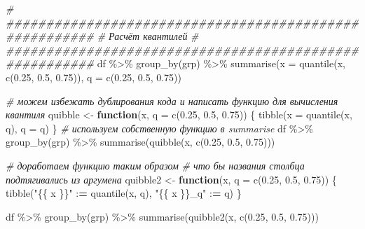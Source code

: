 \documentclass[
]{book}
\newenvironment{Shaded}{\begin{snugshade}}{\end{snugshade}}
\newcommand{\AttributeTok}[1]{\textcolor[rgb]{0.77,0.63,0.00}{#1}}
\newcommand{\CommentTok}[1]{\textcolor[rgb]{0.56,0.35,0.01}{\textit{#1}}}
\newcommand{\ControlFlowTok}[1]{\textcolor[rgb]{0.13,0.29,0.53}{\textbf{#1}}}
\newcommand{\ErrorTok}[1]{\textcolor[rgb]{0.64,0.00,0.00}{\textbf{#1}}}
\newcommand{\FloatTok}[1]{\textcolor[rgb]{0.00,0.00,0.81}{#1}}
\newcommand{\FunctionTok}[1]{\textcolor[rgb]{0.00,0.00,0.00}{#1}}
\newcommand{\NormalTok}[1]{#1}
\newcommand{\OtherTok}[1]{\textcolor[rgb]{0.56,0.35,0.01}{#1}}
\newcommand{\SpecialCharTok}[1]{\textcolor[rgb]{0.00,0.00,0.00}{#1}}
\newcommand{\StringTok}[1]{\textcolor[rgb]{0.31,0.60,0.02}{#1}}
\begin{document}
\begin{Shaded}
\begin{Highlighting}[]
\CommentTok{\# \#\#\#\#\#\#\#\#\#\#\#\#\#\#\#\#\#\#\#\#\#\#\#\#\#\#\#\#\#\#\#\#\#\#\#\#\#\#\#\#\#\#\#\#\#\#\#\#\#\#\#\#\#\#\#}
\CommentTok{\# Расчёт квантилей}
\CommentTok{\# \#\#\#\#\#\#\#\#\#\#\#\#\#\#\#\#\#\#\#\#\#\#\#\#\#\#\#\#\#\#\#\#\#\#\#\#\#\#\#\#\#\#\#\#\#\#\#\#\#\#\#\#\#\#\#}
\NormalTok{df }\SpecialCharTok{\%\textgreater{}\%} 
  \FunctionTok{group\_by}\NormalTok{(grp) }\SpecialCharTok{\%\textgreater{}\%} 
  \FunctionTok{summarise}\NormalTok{(}\AttributeTok{x =} \FunctionTok{quantile}\NormalTok{(x, }\FunctionTok{c}\NormalTok{(}\FloatTok{0.25}\NormalTok{, }\FloatTok{0.5}\NormalTok{, }\FloatTok{0.75}\NormalTok{)), }\AttributeTok{q =} \FunctionTok{c}\NormalTok{(}\FloatTok{0.25}\NormalTok{, }\FloatTok{0.5}\NormalTok{, }\FloatTok{0.75}\NormalTok{))}

\CommentTok{\# можем избежать дублирования кода и написать функцию для вычисления квантиля}
\NormalTok{quibble }\OtherTok{\textless{}{-}} \ControlFlowTok{function}\NormalTok{(x, }\AttributeTok{q =} \FunctionTok{c}\NormalTok{(}\FloatTok{0.25}\NormalTok{, }\FloatTok{0.5}\NormalTok{, }\FloatTok{0.75}\NormalTok{)) \{}
  \FunctionTok{tibble}\NormalTok{(}\AttributeTok{x =} \FunctionTok{quantile}\NormalTok{(x, q), }\AttributeTok{q =}\NormalTok{ q)}
\NormalTok{\}}
\CommentTok{\# используем собственную функцию в summarise}
\NormalTok{df }\SpecialCharTok{\%\textgreater{}\%} 
  \FunctionTok{group\_by}\NormalTok{(grp) }\SpecialCharTok{\%\textgreater{}\%} 
  \FunctionTok{summarise}\NormalTok{(}\FunctionTok{quibble}\NormalTok{(x, }\FunctionTok{c}\NormalTok{(}\FloatTok{0.25}\NormalTok{, }\FloatTok{0.5}\NormalTok{, }\FloatTok{0.75}\NormalTok{)))}

\CommentTok{\# доработаем функцию таким образом }
\CommentTok{\# что бы названия столбца подтягивались из аргумена}
\NormalTok{quibble2 }\OtherTok{\textless{}{-}} \ControlFlowTok{function}\NormalTok{(x, }\AttributeTok{q =} \FunctionTok{c}\NormalTok{(}\FloatTok{0.25}\NormalTok{, }\FloatTok{0.5}\NormalTok{, }\FloatTok{0.75}\NormalTok{)) \{}
  \FunctionTok{tibble}\NormalTok{(}\StringTok{"\{\{ x \}\}"} \SpecialCharTok{:}\ErrorTok{=} \FunctionTok{quantile}\NormalTok{(x, q), }\StringTok{"\{\{ x \}\}\_q"} \SpecialCharTok{:}\ErrorTok{=}\NormalTok{ q)}
\NormalTok{\}}

\NormalTok{df }\SpecialCharTok{\%\textgreater{}\%} 
  \FunctionTok{group\_by}\NormalTok{(grp) }\SpecialCharTok{\%\textgreater{}\%} 
  \FunctionTok{summarise}\NormalTok{(}\FunctionTok{quibble2}\NormalTok{(x, }\FunctionTok{c}\NormalTok{(}\FloatTok{0.25}\NormalTok{, }\FloatTok{0.5}\NormalTok{, }\FloatTok{0.75}\NormalTok{)))}



\end{Highlighting}
\end{Shaded}
\end{document}
